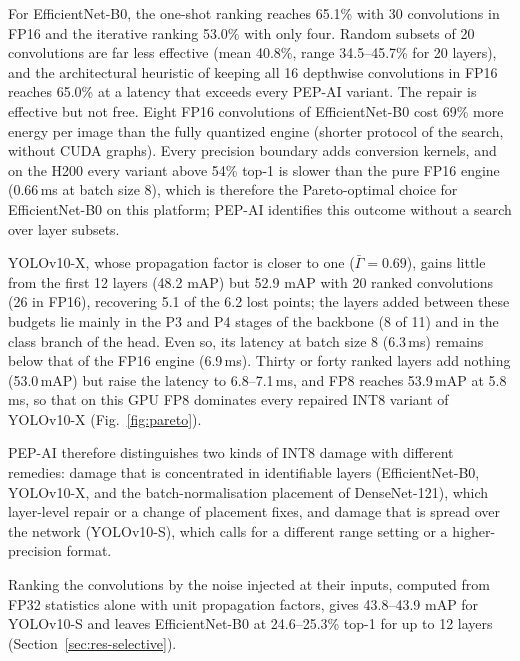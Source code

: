 \documentclass[pdflatex,sn-mathphys-num]{sn-jnl}%
\theoremstyle{thmstyleone}%
\theoremstyle{thmstyletwo}%
\theoremstyle{thmstylethree}%
\begin{document}
\begin{appendices}
For EfficientNet-B0, the one-shot ranking reaches 65.1\% with 30 convolutions in FP16 and the iterative ranking 53.0\% with only four. Random subsets of 20 convolutions are far less effective (mean 40.8\%, range 34.5--45.7\% for 20 layers), and the architectural heuristic of keeping all 16 depthwise convolutions in FP16 reaches 65.0\% at a latency that exceeds every PEP-AI variant. The repair is effective but not free. Eight FP16 convolutions of EfficientNet-B0 cost 69\% more energy per image than the fully quantized engine (shorter protocol of the search, without CUDA graphs). Every precision boundary adds conversion kernels, and on the H200 every variant above 54\% top-1 is slower than the pure FP16 engine (0.66\,ms at batch size 8), which is therefore the Pareto-optimal choice for EfficientNet-B0 on this platform; PEP-AI identifies this outcome without a search over layer subsets.

YOLOv10-X, whose propagation factor is closer to one ($\bar\Gamma=0.69$), gains little from the first 12 layers (48.2 mAP) but 52.9 mAP with 20 ranked convolutions (26 in FP16), recovering 5.1 of the 6.2 lost points; the layers added between these budgets lie mainly in the P3 and P4 stages of the backbone (8 of 11) and in the class branch of the head. Even so, its latency at batch size 8 (6.3\,ms) remains below that of the FP16 engine (6.9\,ms). Thirty or forty ranked layers add nothing (53.0\,mAP) but raise the latency to 6.8--7.1\,ms, and FP8 reaches 53.9\,mAP at 5.8\,ms, so that on this GPU FP8 dominates every repaired INT8 variant of YOLOv10-X (Fig.~\ref{fig:pareto}).

PEP-AI therefore distinguishes two kinds of INT8 damage with different remedies: damage that is concentrated in identifiable layers (EfficientNet-B0, YOLOv10-X, and the batch-normalisation placement of DenseNet-121), which layer-level repair or a change of placement fixes, and damage that is spread over the network (YOLOv10-S), which calls for a different range setting or a higher-precision format.

Ranking the convolutions by the noise injected at their inputs, computed from FP32 statistics alone with unit propagation factors, gives 43.8--43.9 mAP for YOLOv10-S and leaves EfficientNet-B0 at 24.6--25.3\% top-1 for up to 12 layers (Section~\ref{sec:res-selective}).


\end{appendices}
\end{document}
